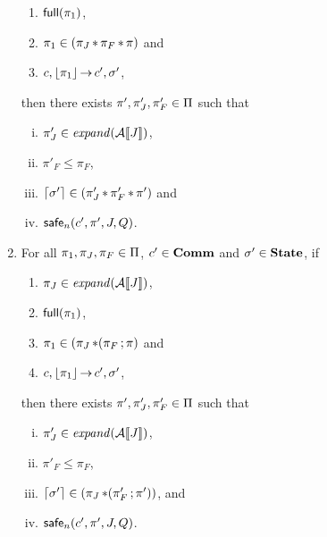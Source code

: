 \documentclass[11pt]{report}
\begin{document}
\begin{enumerate}
\begin{enumerate}
		\item $\mathsf{full}(\pi_1)$,
		
		\item $\pi_1 \in (\pi_J \operatorname{\ast} \pi_F \operatorname{\ast} \pi)$ and
		
		\item $c,\left\lfloor\pi_1\right\rfloor \operatorname{\rightarrow} c',\sigma'$,
		
	\end{enumerate} 
	
	then there exists $\pi',\pi'_J,\pi'_F \in \Pi$ such that 
	
	\begin{enumerate}[i)]
		
		\item $\pi'_J \in \mathit{expand}(\mathcal{A}[\![J]\!])$,
		
		\item $\pi'_F \leq \pi_F$,
		
		\item $\left\lceil\sigma'\right\rceil \in (\pi'_J \operatorname{\ast} \pi'_F \operatorname{\ast} \pi')$ and
		
		\item $\mathsf{safe}_{n}(c', \pi', J, Q)$.
		
	\end{enumerate}

	\item For all $\pi_1,\pi_J,\pi_F \in \Pi$, $c' \in \mathbf{Comm}$ and $\sigma' \in \mathbf{State}$, if 
	
	\begin{enumerate}
		
		\item $\pi_J \in \mathit{expand}(\mathcal{A}[\![J]\!])$,
		
		\item $\mathsf{full}(\pi_1)$,
		
		\item $\pi_1 \in (\pi_J \operatorname{\ast} (\pi_F \operatorname{;} \pi)$ and
		
		\item $c,\left\lfloor\pi_1\right\rfloor \operatorname{\rightarrow} c',\sigma'$,
		
	\end{enumerate} 
	
	then there exists $\pi',\pi'_J,\pi'_F \in \Pi$ such that 
	
	\begin{enumerate}[i)]
		
		\item $\pi'_J \in \mathit{expand}(\mathcal{A}[\![J]\!])$,
		
		\item $\pi'_F \leq \pi_F$,
		
		\item $\left\lceil\sigma'\right\rceil \in (\pi_J \operatorname{\ast} (\pi'_F \operatorname{;} \pi'))$, and
		
		\item $\mathsf{safe}_{n}(c', \pi', J, Q)$.
		
	\end{enumerate}
	
\end{enumerate}
\end{document}
